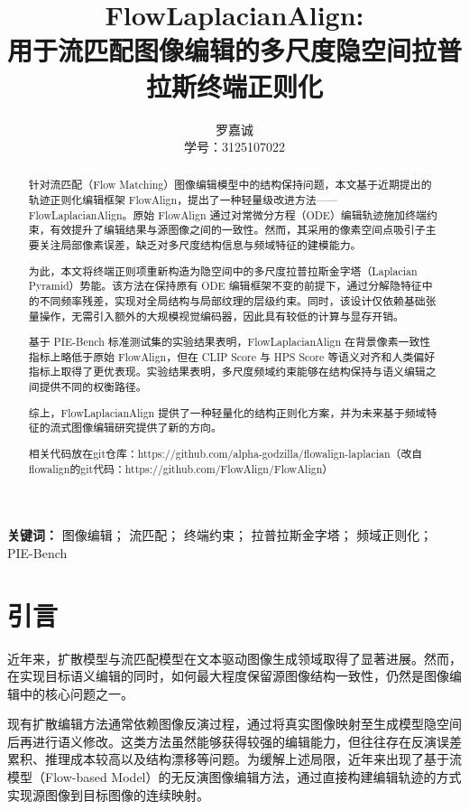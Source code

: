 \documentclass[11pt,a4paper]{ctexart}
\title{
    \textbf{
        FlowLaplacianAlign:\\
        用于流匹配图像编辑的多尺度隐空间拉普拉斯终端正则化
    }
}
\author{
    罗嘉诚 \\
    学号：3125107022
}
\date{}
\numberwithin{equation}{section}
\begin{document}
\maketitle

\begin{abstract}

针对流匹配（Flow Matching）图像编辑模型中的结构保持问题，本文基于近期提出的轨迹正则化编辑框架 FlowAlign，提出了一种轻量级改进方法——FlowLaplacianAlign。原始 FlowAlign 通过对常微分方程（ODE）编辑轨迹施加终端约束，有效提升了编辑结果与源图像之间的一致性。然而，其采用的像素空间点吸引子主要关注局部像素误差，缺乏对多尺度结构信息与频域特征的建模能力。

为此，本文将终端正则项重新构造为隐空间中的多尺度拉普拉斯金字塔（Laplacian Pyramid）势能。该方法在保持原有 ODE 编辑框架不变的前提下，通过分解隐特征中的不同频率残差，实现对全局结构与局部纹理的层级约束。同时，该设计仅依赖基础张量操作，无需引入额外的大规模视觉编码器，因此具有较低的计算与显存开销。

基于 PIE-Bench 标准测试集的实验结果表明，FlowLaplacianAlign 在背景像素一致性指标上略低于原始 FlowAlign，但在 CLIP Score 与 HPS Score 等语义对齐和人类偏好指标上取得了更优表现。实验结果表明，多尺度频域约束能够在结构保持与语义编辑之间提供不同的权衡路径。

综上，FlowLaplacianAlign 提供了一种轻量化的结构正则化方案，并为未来基于频域特征的流式图像编辑研究提供了新的方向。

相关代码放在git仓库：https://github.com/alpha-godzilla/flowalign-laplacian（改自flowalign的git代码：https://github.com/FlowAlign/FlowAlign）

\end{abstract}

\vspace{1em}

\noindent
\textbf{关键词：}
图像编辑；
流匹配；
终端约束；
拉普拉斯金字塔；
频域正则化；
PIE-Bench

\section{引言}

近年来，扩散模型与流匹配模型在文本驱动图像生成领域取得了显著进展。然而，在实现目标语义编辑的同时，如何最大程度保留源图像结构一致性，仍然是图像编辑中的核心问题之一。

现有扩散编辑方法通常依赖图像反演过程，通过将真实图像映射至生成模型隐空间后再进行语义修改。这类方法虽然能够获得较强的编辑能力，但往往存在反演误差累积、推理成本较高以及结构漂移等问题。为缓解上述局限，近年来出现了基于流模型（Flow-based Model）的无反演图像编辑方法，通过直接构建编辑轨迹的方式实现源图像到目标图像的连续映射。
\end{document}
